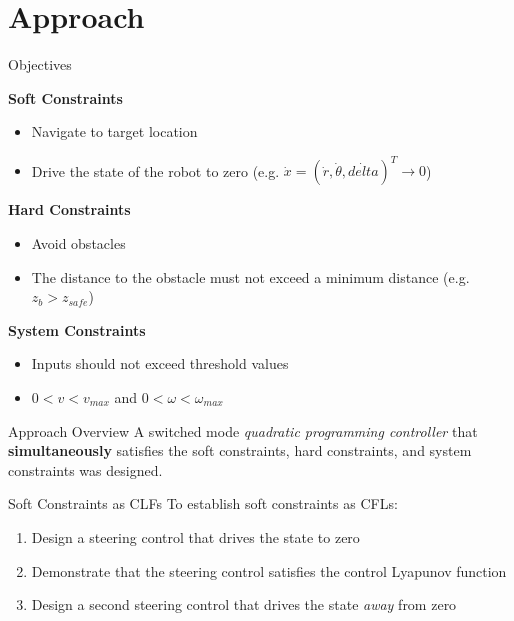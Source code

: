 \documentclass[10pt]{beamer}
\begin{document}
\section{Approach}
\begin{frame}{Objectives}

\textbf{Soft Constraints}
\begin{itemize}
\item Navigate to target location\\
\item Drive the state of the robot to zero (e.g. $\dot{x}=(\dot{r},\dot{\theta},\dot{delta})^T \to 0$)\\ 
\end{itemize}

\textbf{Hard Constraints}
\begin{itemize}
\item Avoid obstacles\\ 
\item The distance to the obstacle must not exceed a minimum distance (e.g. $z_b>z_{safe}$)\\
\end{itemize}

\textbf{System Constraints}
\begin{itemize}
\item Inputs should not exceed threshold values\\ 
\item $0<v<v_{max}$ and $0<\omega<\omega_{max}$\\
\end{itemize}
\end{frame}

\begin{frame}{Approach Overview}
A \alert{switched mode} \emph{quadratic programming controller} that \textbf{simultaneously} satisfies the soft constraints, hard constraints, and system constraints was designed.
\end{frame}

\begin{frame}{Soft Constraints as CLFs}
To establish soft constraints as CFLs:
\begin{enumerate}
\item<1-> Design a steering control that drives the state to zero\\
\item<2-> Demonstrate that the steering control satisfies the control Lyapunov function\\
\item<3-> Design a second steering control that drives the state \textit{away} from zero\\
\end{enumerate}
\end{frame}
\end{document}
